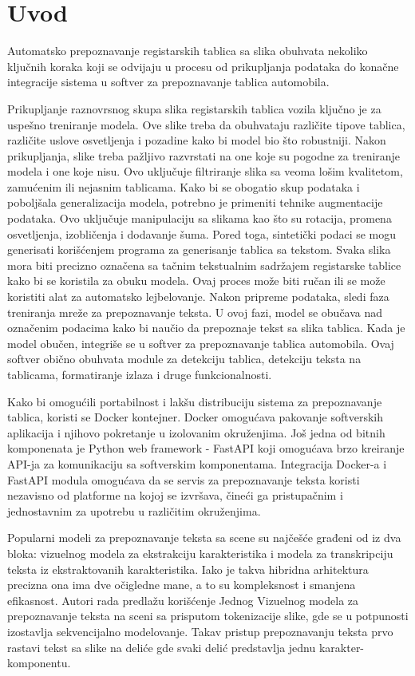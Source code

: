 \documentclass[a4paper,12pt]{article}
\begin{document}
	\section{Uvod}
	Automatsko prepoznavanje registarskih tablica sa slika obuhvata nekoliko ključnih koraka koji se odvijaju u procesu od prikupljanja podataka do konačne integracije sistema u softver za prepoznavanje tablica automobila.
	
	Prikupljanje raznovrsnog skupa slika registarskih tablica vozila ključno je za uspešno treniranje modela. Ove slike treba da obuhvataju različite tipove tablica, različite uslove osvetljenja i pozadine kako bi model bio što robustniji. Nakon prikupljanja, slike treba pažljivo razvrstati na one koje su pogodne za treniranje modela i one koje nisu. Ovo uključuje filtriranje slika sa veoma lošim kvalitetom, zamućenim ili nejasnim tablicama. Kako bi se obogatio skup podataka i poboljšala generalizacija modela, potrebno je primeniti tehnike augmentacije podataka. Ovo uključuje manipulaciju sa slikama kao što su rotacija, promena osvetljenja, izobličenja i dodavanje šuma. Pored toga, sintetički podaci se mogu generisati korišćenjem programa za generisanje tablica sa tekstom. Svaka slika mora biti precizno označena sa tačnim tekstualnim sadržajem registarske tablice kako bi se koristila za obuku modela. Ovaj proces može biti ručan ili se može koristiti alat za automatsko lejbelovanje. Nakon pripreme podataka, sledi faza treniranja mreže za prepoznavanje teksta. U ovoj fazi, model se obučava nad označenim podacima kako bi naučio da prepoznaje tekst sa slika tablica. Kada je model obučen, integriše se u softver za prepoznavanje tablica automobila. Ovaj softver obično obuhvata module za detekciju tablica, detekciju teksta na tablicama, formatiranje izlaza i druge funkcionalnosti.
	
	Kako bi omogućili portabilnost i lakšu distribuciju sistema za prepoznavanje tablica, koristi se Docker kontejner. Docker omogućava pakovanje softverskih aplikacija i njihovo pokretanje u izolovanim okruženjima. Još jedna od bitnih komponenata je Python web framework - FastAPI koji omogućava brzo kreiranje API-ja za komunikaciju sa softverskim komponentama. Integracija Docker-a i FastAPI modula omogućava da se servis za prepoznavanje teksta koristi nezavisno od platforme na kojoj se izvršava, čineći ga pristupačnim i jednostavnim za upotrebu u različitim okruženjima.
	\newpage

	
	Popularni modeli za prepoznavanje teksta sa scene su najčešće građeni od iz dva bloka: vizuelnog modela za ekstrakciju karakteristika i modela za transkripciju teksta iz ekstraktovanih karakteristika. Iako je takva hibridna arhitektura precizna ona ima dve očigledne mane, a to su kompleksnost i smanjena efikasnost. Autori rada predlažu korišćenje Jednog Vizuelnog modela za prepoznavanje teksta na sceni sa prisputom tokenizacije slike, gde se u potpunosti izostavlja sekvencijalno modelovanje. Takav pristup prepoznavanju teksta prvo rastavi tekst sa slike na deliće gde svaki delić predstavlja jednu karakter-komponentu.
	
\end{document}
